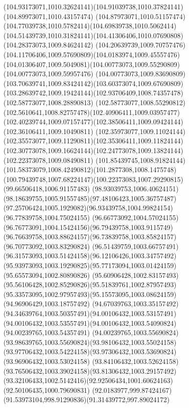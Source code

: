 {{  \curveto(104.93173071,1010.32624141)(104.91039738,1010.37824141)(104.89973071,1010.43157474)
  \curveto(104.87973071,1010.51157474)(104.77039738,1010.5782414)(104.69839738,1010.5062414)
  \curveto(104.51439739,1010.31824141)(104.41306406,1010.07690808)(104.28373073,1009.84624142)
  \curveto(104.20639739,1009.70757476)(104.11706406,1009.57690809)(104.0183974,1009.45557476)
  \curveto(104.01306407,1009.5049081)(104.00773073,1009.55290809)(104.00773073,1009.59957476)
  \curveto(104.00773073,1009.83690809)(103.70639741,1009.83424142)(103.60373074,1009.67690809)
  \curveto(103.28639742,1009.19424144)(102.93706409,1008.74357478)(102.58773077,1008.28890813)
  \curveto(102.58773077,1008.55290812)(102.5610641,1008.82757478)(102.40906411,1009.03957477)
  \curveto(102.40239744,1009.07157477)(102.38506411,1009.09424144)(102.36106411,1009.10490811)
  \curveto(102.35973077,1009.11024144)(102.35573077,1009.11290811)(102.35306411,1009.11824144)
  \curveto(102.30773078,1009.16624144)(102.24773078,1009.13824144)(102.22373078,1009.08490811)
  \curveto(101.85439745,1008.91824144)(101.58373079,1008.42490812)(101.2877308,1008.1475748)
  \curveto(100.79439748,1007.68224147)(100.22373083,1007.29290815)(99.66506418,1006.91157483)
  \curveto(98.93039753,1006.40624151)(98.18639755,1005.91557485)(97.48106423,1005.36757487)
  \curveto(97.25706424,1005.1929082)(96.93439758,1004.99824154)(96.77839758,1004.75024155)
  \curveto(96.66773092,1004.57024155)(96.76773091,1004.15424156)(96.79439758,1003.9115749)
  \curveto(96.76639758,1003.88624157)(96.73839758,1003.85824157)(96.70773092,1003.83290824)
  \curveto(96.51439759,1003.66757491)(96.31573093,1003.51424158)(96.12106426,1003.34757492)
  \curveto(95.93973093,1003.19290825)(95.77173094,1003.01424159)(95.65573094,1002.80890826)
  \curveto(95.60906428,1002.83157493)(95.56106428,1002.85290826)(95.51839761,1002.87957493)
  \curveto(95.33573095,1002.97957493)(95.15573095,1003.08624159)(94.96906429,1003.18757492)
  \curveto(94.67039763,1003.35157492)(94.34639764,1003.50357491)(94.00106432,1003.53157491)
  \curveto(94.00106432,1003.53557491)(94.00106432,1003.54090824)(94.00239765,1003.54357491)
  \curveto(94.00239765,1003.55690824)(93.98639765,1003.55690824)(93.98106432,1003.55024158)
  \curveto(93.97706432,1003.54224158)(93.97306432,1003.53690824)(93.96906432,1003.53024158)
  \curveto(93.84106432,1003.52624158)(93.76506432,1003.39024158)(93.81306432,1003.29157492)
  \curveto(93.32106433,1002.5142416)(92.92506434,1001.60624163)(92.50106435,1000.79690831)
  \curveto(92.0183977,999.87424167)(91.53973104,998.91290836)(91.31439772,997.89024172)
}}

